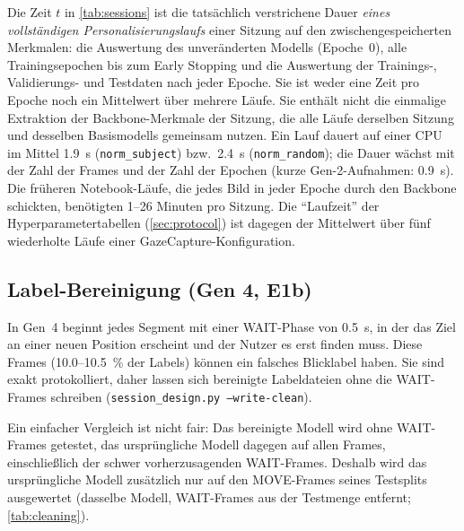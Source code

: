 \documentclass[
  11pt,
  a4paper,
  oneside,
  DIV=12,
  BCOR=8mm,
  parskip=half,
  headings=normal,
  bibliography=totoc,
  listof=totoc
]{scrreprt}
\newcommand{\code}[1]{\texttt{#1}}
\begin{document}
Die Zeit $t$ in \cref{tab:sessions} ist die tatsächlich verstrichene Dauer
\emph{eines vollständigen Personalisierungslaufs} einer Sitzung auf den
zwischengespeicherten Merkmalen: die Auswertung des unveränderten Modells
(Epoche~0), alle Trainingsepochen bis zum Early Stopping und die Auswertung
der Trainings-, Validierungs- und Testdaten nach jeder Epoche. Sie ist weder
eine Zeit pro Epoche noch ein Mittelwert über mehrere Läufe. Sie enthält
nicht die einmalige Extraktion der Backbone-Merkmale der Sitzung, die alle
Läufe derselben Sitzung und desselben Basismodells gemeinsam nutzen. Ein Lauf
dauert auf einer CPU im Mittel \SI{1,9}{\second} (\code{norm\_subject}) bzw.\
\SI{2,4}{\second} (\code{norm\_random}); die Dauer wächst mit der Zahl der
Frames und der Zahl der Epochen (kurze Gen-2-Aufnahmen: \SI{0,9}{\second}).
Die früheren Notebook-Läufe, die jedes Bild in jeder Epoche durch den
Backbone schickten, benötigten 1--26 Minuten pro Sitzung. Die
\enquote{Laufzeit} der Hyperparametertabellen (\cref{sec:protocol}) ist
dagegen der Mittelwert über fünf wiederholte Läufe einer
GazeCapture-Konfiguration.

\subsection{Label-Bereinigung (Gen 4, E1b)}
\label{sec:cleaning}

In Gen~4 beginnt jedes Segment mit einer WAIT-Phase von \SI{0,5}{\second}, in
der das Ziel an einer neuen Position erscheint und der Nutzer es erst finden
muss. Diese Frames (\SI{10,0}{}--\SI{10,5}{\percent} der Labels) können ein
falsches Blicklabel haben. Sie sind exakt protokolliert, daher lassen sich
bereinigte Labeldateien ohne die WAIT-Frames schreiben
(\code{session\_design.py --write-clean}).

Ein einfacher Vergleich ist nicht fair: Das bereinigte Modell wird ohne
WAIT-Frames getestet, das ursprüngliche Modell dagegen auf allen Frames,
einschließlich der schwer vorherzusagenden WAIT-Frames. Deshalb wird das
ursprüngliche Modell zusätzlich nur auf den MOVE-Frames seines Testsplits
ausgewertet (dasselbe Modell, WAIT-Frames aus der Testmenge entfernt;
\cref{tab:cleaning}).
\end{document}
